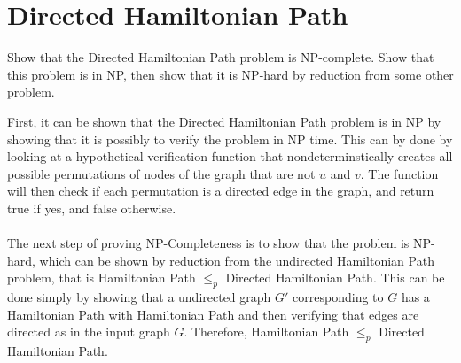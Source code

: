\documentclass[12pt]{article}
\begin{document}
\section{Directed Hamiltonian Path}\label{hamiltonian path}
Show that the Directed Hamiltonian Path problem is NP-complete. Show that this problem is in NP, then show that it is NP-hard by reduction from some other problem. \\
\begin{addmargin}[2em]{2em}
First, it can be shown that the {\sc Directed Hamiltonian Path} problem is in NP by showing that it is possibly to verify the problem in NP time. This can by done by looking at a hypothetical verification function that nondeterminstically creates all possible permutations of nodes of the graph that are not $u$ and $v$. The function will then check if each permutation is a directed edge in the graph, and return true if yes, and false otherwise. \\ \\
The next step of proving NP-Completeness is to show that the problem is NP-hard, which can be shown by reduction from the undirected {\sc Hamiltonian Path} problem, that is {\sc Hamiltonian Path} $\le_p$ {\sc Directed Hamiltonian Path}. This can be done simply by showing that a undirected graph $G'$ corresponding to $G$ has a Hamiltonian Path with {\sc Hamiltonian Path} and then verifying that edges are directed as in the input graph $G$. Therefore, {\sc Hamiltonian Path} $\le_p$ {\sc Directed Hamiltonian Path}.
\end{addmargin}
\end{document}
